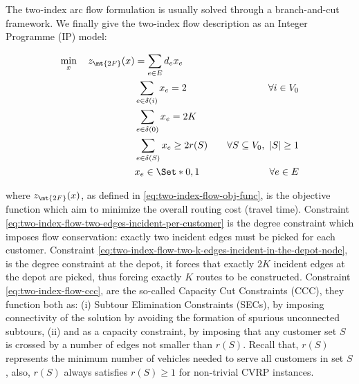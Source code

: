 The two-index arc flow formulation is usually solved through a branch-and-cut framework.
We finally give the two-index flow description as an Integer Programme (IP) model:



\begin{align}
	\min_{x} \quad z_\mt{2F}(x) & = \sum_{e \in E} d_e x_e \label{eq:two-index-flow-obj-func}                                                                                     \\
	                            & \sum_{e \in \delta(i)} x_e = 2                                  & \quad \forall i \in V_0 \label{eq:two-index-flow-two-edges-incident-per-customer} \\
                                & \sum_{e \in \delta(0)} x_e = 2 K                                           & \label{eq:two-index-flow-two-k-edges-incident-in-the-depot-node}                  \\
	                            & \sum_{e \in \delta(S)} x_e \ge 2 r(S)                           & \quad \forall S \subseteq V_0,\ |S| \ge 1 \label{eq:two-index-flow-ccc}           \\
	                            & x_e                   \in \Set*{0, 1}                                & \quad \forall e \in E \label{eq:two-index-flow-x-mip-var-bounds}
\end{align}

where $z_\mt{2F}(x)$, as defined in \eqref{eq:two-index-flow-obj-func}, is the objective function which aim to minimize the overall routing cost (travel time).
Constraint \eqref{eq:two-index-flow-two-edges-incident-per-customer} is the degree constraint which imposes flow conservation: exactly two incident edges must be picked for each customer.
Constraint \eqref{eq:two-index-flow-two-k-edges-incident-in-the-depot-node}, is the degree constraint at the depot, it forces that exactly $2K$ incident edges at the depot are picked, thus forcing exactly $K$ routes to be constructed.
Constraint \eqref{eq:two-index-flow-ccc}, are the so-called Capacity Cut Constraints (CCC), they function both as:
(i) Subtour Elimination Constraints (SECs), by imposing connectivity of the solution by avoiding the formation of spurious unconnected subtours,
(ii) and as a capacity constraint, by imposing that any customer set $S$ is crossed by a number of edges not smaller than $r(S)$.
Recall that, $r(S)$ represents the minimum number of vehicles needed to serve all customers in set $S$,
also, $r(S)$ always satisfies $r(S) \ge 1$ for non-trivial CVRP instances.

